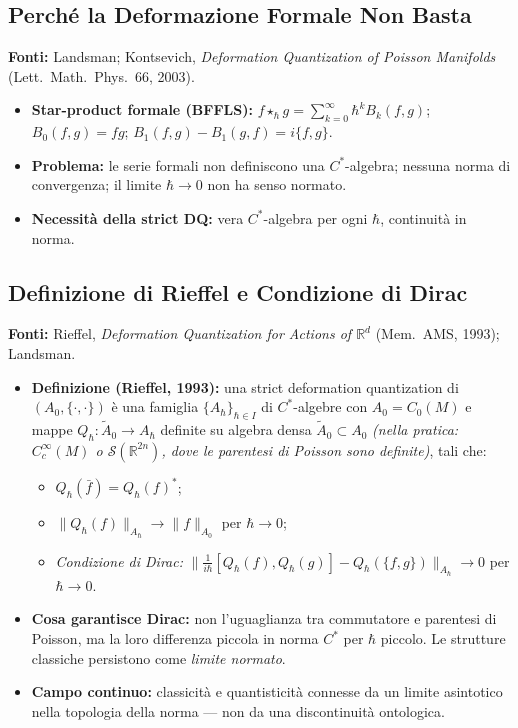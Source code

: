 \documentclass[12pt, a4paper]{article}
\newcommand{\fonti}[1]{%
	\begin{fontebox}
		\textcolor{fontecolor}{\footnotesize\textbf{Fonti:} #1}
	\end{fontebox}%
}
\begin{document}
	\subsection{Perché la Deformazione Formale Non Basta}
	
	\fonti{Landsman; Kontsevich, \textit{Deformation Quantization of Poisson Manifolds}
		(Lett.\ Math.\ Phys.\ 66, 2003).}
	
	\begin{itemize}
		\item \textbf{Star-product formale (BFFLS):} $f\star_\hbar g=\sum_{k=0}^\infty
		\hbar^k B_k(f,g)$; $B_0(f,g)=fg$; $B_1(f,g)-B_1(g,f)=i\{f,g\}$.
		\item \textbf{Problema:} le serie formali non definiscono una $C^*$-algebra;
		nessuna norma di convergenza; il limite $\hbar\to 0$ non ha senso normato.
		\item \textbf{Necessità della strict DQ:} vera $C^*$-algebra per ogni $\hbar$,
		continuità in norma.
	\end{itemize}
	
	\subsection{Definizione di Rieffel e Condizione di Dirac}
	
	\fonti{Rieffel, \textit{Deformation Quantization for Actions of $\mathbb{R}^d$}
		(Mem.\ AMS, 1993); Landsman.}
	
	\begin{itemize}
		\item \textbf{Definizione (Rieffel, 1993):} una strict deformation quantization
		di $(A_0,\{\cdot,\cdot\})$ è una famiglia $\{A_\hbar\}_{\hbar\in I}$ di
		$C^*$-algebre con $A_0=C_0(M)$ e mappe $Q_\hbar:\widetilde{A}_0\to A_\hbar$
		definite su algebra densa $\widetilde{A}_0\subset A_0$ \emph{(nella pratica:
			$C^\infty_c(M)$ o $\mathcal{S}(\mathbb{R}^{2n})$, dove le parentesi di
			Poisson sono definite)}, tali che:
		\begin{itemize}
			\item[(i)] $Q_\hbar(\bar f)=Q_\hbar(f)^*$;
			\item[(ii)] $\|Q_\hbar(f)\|_{A_\hbar}\to\|f\|_{A_0}$ per $\hbar\to 0$;
			\item[(iii)] \emph{Condizione di Dirac:}
			$\bigl\|\tfrac{1}{i\hbar}[Q_\hbar(f),Q_\hbar(g)]-Q_\hbar(\{f,g\})\bigr\|_{A_\hbar}
			\to 0$ per $\hbar\to 0$.
		\end{itemize}
		\item \textbf{Cosa garantisce Dirac:} non l'uguaglianza tra commutatore e parentesi
		di Poisson, ma la loro differenza piccola in norma $C^*$ per $\hbar$ piccolo.
		Le strutture classiche persistono come \emph{limite normato}.
		\item \textbf{Campo continuo:} classicità e quantisticità connesse da un limite
		asintotico nella topologia della norma --- non da una discontinuità ontologica.
	\end{itemize}
	
\end{document}
